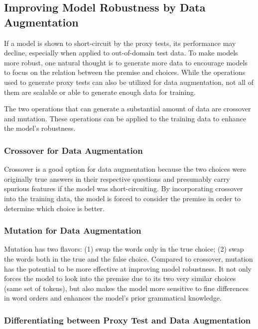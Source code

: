 \subsection{Improving Model Robustness by Data Augmentation}

If a model is shown to short-circuit by the proxy tests, its performance may decline, especially when applied to out-of-domain test data. To make models more robust, one natural thought is to generate more data to encourage models to focus on the relation between the premise and choices. While the operations used to generate proxy tests can also be utilized for data augmentation, not all of them are scalable or able to generate enough data for training.

The two operations that can generate a substantial amount of data are crossover and mutation. These operations can be applied to the training data to enhance the model's robustness.

\subsubsection*{Crossover for Data Augmentation}

Crossover is a good option for data augmentation because the two choices were originally true answers in their respective questions and presumably carry spurious features if the model was short-circuiting. By incorporating crossover into the training data, the model is forced to consider the premise in order to determine which choice is better.

\subsubsection*{Mutation for Data Augmentation}

Mutation has two flavors: (1) swap the words only in the true choice; (2) swap the words both in the true and the false choice. Compared to crossover, mutation has the potential to be more effective at improving model robustness. It not only forces the model to look into the premise due to its two very similar choices (same set of tokens), but also makes the model more sensitive to fine differences in word orders and enhances the model's prior grammatical knowledge.

\subsubsection*{Differentiating between Proxy Test and Data Augmentation}

